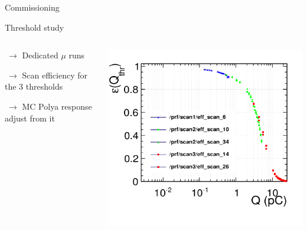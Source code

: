 \documentclass[10pt]{beamer}
\begin{document}
\begin{frame}{Commissioning}
\begin{block}{Threshold study}
\begin{columns}
\begin{column}{0.5\textwidth}
  {
    \par $ ~ \rightarrow$ Dedicated $\mu$ runs
    \par $ ~ \rightarrow$ Scan efficiency for the 3 thresholds
    \par $ ~ \rightarrow$ MC Polya response adjust from it
  }  
\end{column}
\begin{column}{0.5\textwidth}

  \centerline{\includegraphics[height=0.45\textheight]{jpg/thresholdscan.jpg}}

\end{column}
\end{columns}
\end{block}
\end{frame}
\end{document}
